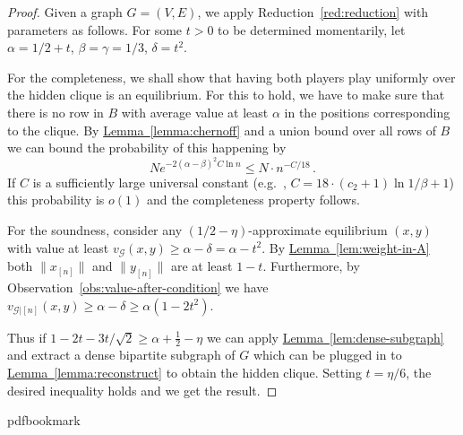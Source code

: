 \documentclass[10pt]{article}
\theoremstyle{definition}
\providecommand{\eg}{e.g.\ }
\numberwithin{equation}{section}
\newcommand{\expref}[2]{\texorpdfstring{\hyperref[#2]{#1~\ref{#2}}}{#1~\ref{#2}}}
\newcommand{\G}{\mathcal{G}}
\begin{document}
\begin{proof}
  Given a graph $G = (V,E)$, we apply Reduction~\ref{red:reduction} with parameters as follows.
  For some $t>0$ to be determined momentarily, let $\alpha = {1}/{2} + t$,
  $\beta = \gamma = 1/3$, $\delta = t^2$.

  For the completeness, we shall show that having both players play
  uniformly over the hidden clique is an equilibrium.  For this to
  hold, we have to make sure that there is no row in $B$ with average
  value at least $\alpha$ in the positions corresponding to the
  clique.  By \expref{Lemma}{lemma:chernoff} and a union bound over all
  rows of $B$ we can bound the probability of this happening by
  $$N e^{-2 (\alpha-\beta)^2 C \ln n} \le N \cdot n^{-C/18}\,.$$ If $C$
  is a sufficiently large universal constant (\eg, $C = 18 \cdot
  (c_2+1) \ln 1/\beta + 1$) this probability is $o(1)$ and the
  completeness property follows.

  For the soundness, consider any $({1}/{2}-\eta)$-approximate equilibrium $(x,
  y)$ with value at least $v_{\G}(x,y) \ge \alpha - \delta=\alpha-t^2$.  By
  \expref{Lemma}{lem:weight-in-A} both $\|x_{[n]}\|$ and $\|y_{[n]}\|$ are
  at least $1-t$.  Furthermore, by
  Observation~\ref{obs:value-after-condition} we have $v_{\G|[n]}(x,y)
  \ge \alpha - \delta \ge \alpha(1 - 2t^2)$.

  Thus if $1 - 2t - 3t/\sqrt{2} \ge \alpha + \frac{1}{2} - \eta$ we can apply
  \expref{Lemma}{lem:dense-subgraph} and extract a dense bipartite
  subgraph of $G$ which can be plugged in to
  \expref{Lemma}{lemma:reconstruct} to obtain the hidden clique.  Setting
  $t = \eta/6$, the desired inequality holds and we get the result.
%
\end{proof}
\clearpage
\begingroup\raggedright
%
%
%
%
%
\providecommand{\bibhead}[1]{}
%
\expandafter\ifx\csname pdfbookmark\endcsname\relax%
  \providecommand{\tocrefpdfbookmark}{}
\else\providecommand{\tocrefpdfbookmark}{%
   \hypertarget{tocreferences}{}%
   \pdfbookmark[1]{References}{tocreferences}}%
\fi
\end{document}
